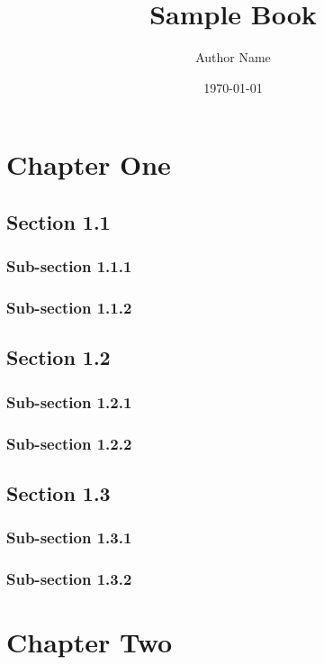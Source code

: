 \documentclass[a4paper,12pt]{book}
\begin{document}
\frontmatter
\title{Sample Book}
\author{Author Name}
\date{\today}
\maketitle

\tableofcontents

\mainmatter

\chapter{Chapter One}
\section{Section 1.1}
\subsection{Sub-section 1.1.1}
\lipsum[1-2]
\subsection{Sub-section 1.1.2}
\lipsum[3-4]

\section{Section 1.2}
\subsection{Sub-section 1.2.1}
\lipsum[5-6]
\subsection{Sub-section 1.2.2}
\lipsum[7-8]

\section{Section 1.3}
\subsection{Sub-section 1.3.1}
\lipsum[9-10]
\subsection{Sub-section 1.3.2}
\lipsum[11-12]

\chapter{Chapter Two}
\end{document}

